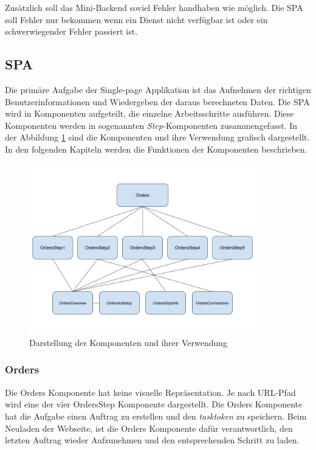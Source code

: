 Zusätzlich soll das Mini-Backend soviel Fehler handhaben wie möglich. Die SPA soll Fehler nur bekommen wenn ein Dienst nicht verfügbar ist oder ein schwerwiegender Fehler passiert ist.

\subsection{SPA}
Die primäre Aufgabe der Single-page Applikation ist das Aufnehmen der richtigen Benutzerinformationen und Wiedergeben der daraus berechneten Daten. Die SPA wird in Komponenten aufgeteilt, die einzelne Arbeitsschritte ausführen. Diese Komponenten werden in sogenannten \textit{Step-}Komponenten zusammengefasst. In der Abbildung \ref{fig:comparch} sind die Komponenten und ihre Verwendung grafisch dargestellt. In den folgenden Kapiteln werden die Funktionen der Komponenten beschrieben.

\begin{figure}[ht]
	\centering
  \includegraphics[width=0.88\textwidth]{images/comparch.png}
	\caption{Darstellung der Komponenten und ihrer Verwendung}
	\label{fig:comparch}
\end{figure}

\subsubsection{Orders}
Die Orders Komponente hat keine visuelle Repräsentation. Je nach URL-Pfad wird eine der vier OrdersStep Komponente dargestellt. Die Orders Komponente hat die Aufgabe einen Auftrag zu erstellen und den \textit{tasktoken} zu speichern. Beim  Neuladen der Webseite, ist die Orders Komponente dafür verantwortlich, den letzten Auftrag wieder Aufzunehmen und den entsprechenden Schritt zu laden.

